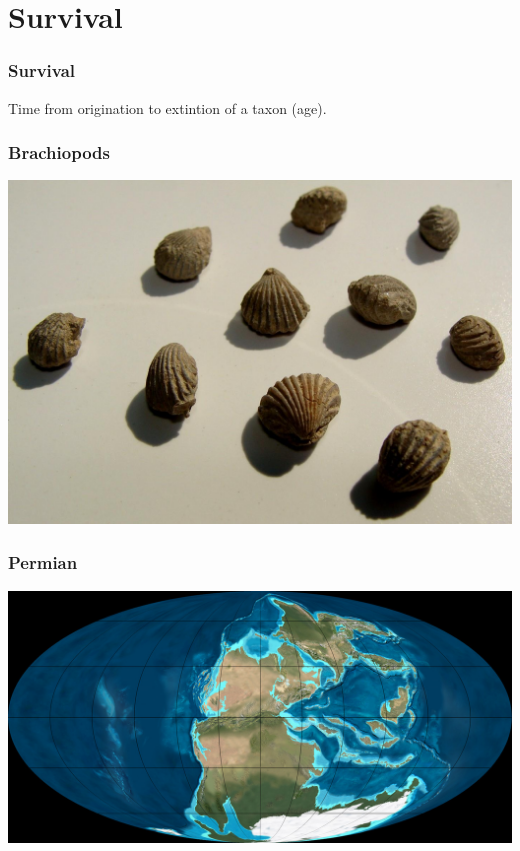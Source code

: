 \documentclass{beamer}
\begin{document}
\section{Survival}

\begin{frame}
  \frametitle{Survival}

  \begin{definition}
    Time from origination to extintion of a taxon (age).
  \end{definition}

\end{frame}

\begin{frame}
  \frametitle{Brachiopods}
  \includegraphics[height = 0.9\textheight, width = \textwidth, keepaspectratio = true]{figure/permian_brac}

  \tiny{}
\end{frame}

\begin{frame}
  \frametitle{Permian}
  \includegraphics[height = \textheight, width = \textwidth, keepaspectratio = true]{figure/per_map}

  \tiny{}
\end{frame}
\end{document}
